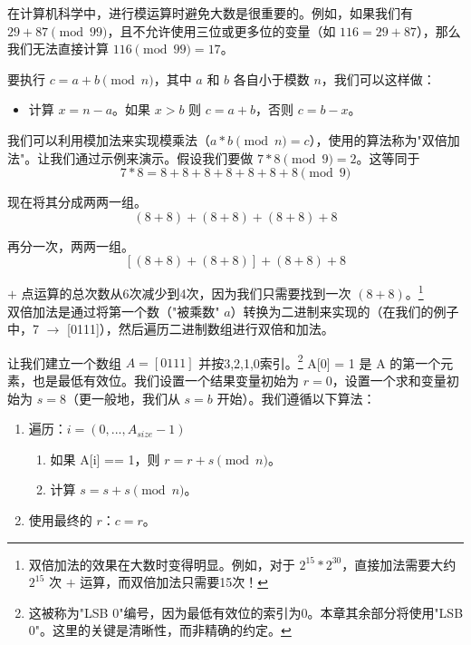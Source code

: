 在计算机科学中，进行模运算时避免大数是很重要的。例如，如果我们有 $29+87 \pmod{99}$，且不允许使用三位或更多位的变量（如 $116 = 29+87$），那么我们无法直接计算 $116 \pmod{99} = 17$。

要执行 $c = a+b \pmod n$，其中 $a$ 和 $b$ 各自小于模数 $n$，我们可以这样做：
\begin{itemize}
	\item 计算 $x = n-a$。如果 $x > b$ 则 $c = a+b$，否则 $c = b - x$。
\end{itemize}

我们可以利用模加法来实现模乘法（$a*b \pmod n = c$），使用的算法称为"双倍加法"。让我们通过示例来演示。假设我们要做 $7*8 \pmod 9 = 2$。这等同于
\[7*8 = 8+8+8+8+8+8+8 \pmod 9\]

现在将其分成两两一组。
\[(8+8) + (8+8) + (8+8) + 8\]

再分一次，两两一组。
\[[(8+8) + (8+8)] + (8+8) + 8\]

$+$ 点运算的总次数从6次减少到4次，因为我们只需要找到一次 $(8+8)$。\footnote{双倍加法的效果在大数时变得明显。例如，对于 $2^{15} * 2^{30}$，直接加法需要大约 $2^{15}$ 次 $+$ 运算，而双倍加法只需要15次！}\\

双倍加法是通过将第一个数（"被乘数" $a$）转换为二进制来实现的（在我们的例子中，7 $\rightarrow$ [0111]），然后遍历二进制数组进行双倍和加法。

让我们建立一个数组 $A = [0111]$ 并按3,2,1,0索引。\footnote{这被称为"LSB 0"编号，因为最低有效位的索引为0。本章其余部分将使用"LSB 0"。这里的关键是清晰性，而非精确的约定。} A[0] = 1 是 A 的第一个元素，也是最低有效位。我们设置一个结果变量初始为 $r = 0$，设置一个求和变量初始为 $s = 8$（更一般地，我们从 $s = b$ 开始）。我们遵循以下算法：
\begin{enumerate}
	\item 遍历：$i = (0,...,A_{size} - 1)$
	\begin{enumerate}
		\item 如果 A[i] == 1，则 $r = r + s \pmod n$。
		\item 计算 $s = s + s \pmod n$。
	\end{enumerate}
	\item 使用最终的 $r$：$c = r$。
\end{enumerate}

